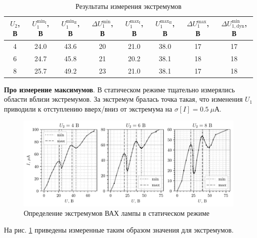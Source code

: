 \begin{table}[h]
    \centering
    \caption{Результаты измерения экстремумов}
    \begin{tabular}{c||cc|c||cc|c||c}
    \toprule
     $U_2$, В &  
     $U_1^{\text{min}_\text{I}}$, В &  
     $U_1^{\text{min}_\text{II}}$, В &  
     $\Delta U_1^{\text{min}}$, В &  
     $U_1^{\text{max}_\text{I}}$, В &  
     $U_1^{\text{max}_\text{II}}$, В  & 
     $\Delta U_1^{\text{max}}$, В &
     $\Delta U_{1, \text{dyn}}^{\text{min}}$, В 
     \\
    \midrule
      4 &  24.0 &  43.6 &   20 & 21.0 &  38.0 &       17 & 17 \\
      6 &  24.7 &  45.8 &   21 & 20.2 &  38.1 &       18 & 18 \\
      8 &  25.7 &  49.2 &   23 & 21.0 &  38.1 &       17 & 18 \\
    \bottomrule
    \end{tabular}
    \label{tab:1}
\end{table}

\newpage

\textbf{Про измерение максимумов}. 
В статическом режиме тщательно измерялись области вблизи экстремумов. За экстремум бралась точка такая, что изменения $U_1$ приводили к отступлению вверх/вниз от экстремума на $\sigma[I] = 0.5\ \mu$А. 

\begin{figure}[ht]
    \centering
    \includegraphics[width=\textwidth]{figures/plot2.pdf}
    \caption{Определение экстремумов ВАХ лампы в статическом режиме}
    \label{fig:2}
\end{figure}

На рис.  \ref{fig:2} приведены измеренные таким образом значения для экстремумов.



